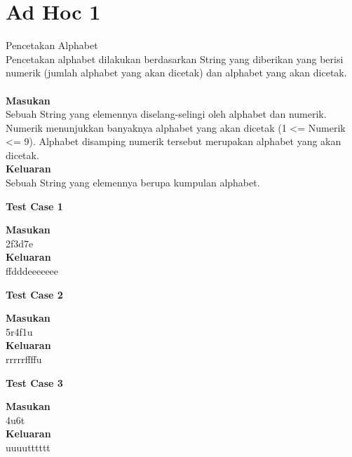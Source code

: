\chapter{Ad Hoc 1}

\begin{permasalahan}{Pencetakan Alphabet}\\
Pencetakan alphabet dilakukan berdasarkan String yang diberikan yang berisi numerik (jumlah alphabet yang akan dicetak) dan alphabet yang akan dicetak.\\
	\\
	\textbf{Masukan}\\
	Sebuah String yang elemennya diselang-selingi oleh alphabet dan numerik. Numerik menunjukkan banyaknya alphabet yang akan dicetak (1 <= Numerik <= 9).  Alphabet disamping numerik tersebut merupakan alphabet yang akan dicetak.\\
	\textbf{Keluaran}\\
	Sebuah String yang elemennya berupa kumpulan alphabet.\\
	\begin{center}
	\textbf{Test Case 1}\\
	\end{center}
	\textbf{Masukan}\\
	2f3d7e\\
	\textbf{Keluaran}\\
	ffdddeeeeeee\\
	\begin{center}
	\textbf{Test Case 2}\\
	\end{center}
	\textbf{Masukan}\\
	5r4f1u\\
	\textbf{Keluaran}\\
	rrrrrffffu\\
	\begin{center}
	\textbf{Test Case 3}\\
	\end{center}
	\textbf{Masukan}\\
	4u6t\\
	\textbf{Keluaran}\\
	uuuutttttt\\
\end{permasalahan}

\newpage

